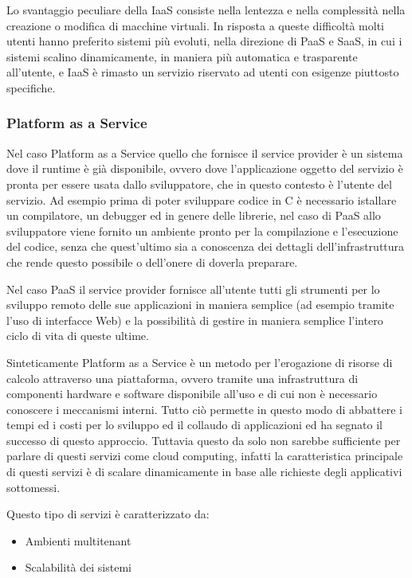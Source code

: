 \documentclass[italian,]{article}
\providecommand{\tightlist}{%
  \setlength{\itemsep}{0pt}\setlength{\parskip}{0pt}}
\begin{document}
Lo svantaggio peculiare della IaaS consiste nella lentezza e nella
complessità nella creazione o modifica di macchine virtuali. In risposta
a queste difficoltà molti utenti hanno preferito sistemi più evoluti,
nella direzione di PaaS e SaaS, in cui i sistemi scalino dinamicamente,
in maniera più automatica e trasparente all'utente, e IaaS è rimasto un
servizio riservato ad utenti con esigenze piuttosto specifiche.

\subsubsection{Platform as a Service}\label{platform-as-a-service}

Nel caso Platform as a Service quello che fornisce il service provider è
un sistema dove il runtime è già disponibile, ovvero dove l'applicazione
oggetto del servizio è pronta per essere usata dallo sviluppatore, che
in questo contesto è l'utente del servizio. Ad esempio prima di poter
sviluppare codice in C è necessario istallare un compilatore, un
debugger ed in genere delle librerie, nel caso di PaaS allo sviluppatore
viene fornito un ambiente pronto per la compilazione e l'esecuzione del
codice, senza che quest'ultimo sia a conoscenza dei dettagli
dell'infrastruttura che rende questo possibile o dell'onere di doverla
preparare.

Nel caso PaaS il service provider fornisce all'utente tutti gli
strumenti per lo sviluppo remoto delle sue applicazioni in maniera
semplice (ad esempio tramite l'uso di interfacce Web) e la possibilità
di gestire in maniera semplice l'intero ciclo di vita di queste ultime.

Sinteticamente Platform as a Service è un metodo per l'erogazione di
risorse di calcolo attraverso una piattaforma, ovvero tramite una
infrastruttura di componenti hardware e software disponibile all'uso e
di cui non è necessario conoscere i meccanismi interni. Tutto ciò
permette in questo modo di abbattere i tempi ed i costi per lo sviluppo
ed il collaudo di applicazioni ed ha segnato il successo di questo
approccio. Tuttavia questo da solo non sarebbe sufficiente per parlare
di questi servizi come cloud computing, infatti la caratteristica
principale di questi servizi è di scalare dinamicamente in base alle
richieste degli applicativi sottomessi.

Questo tipo di servizi è caratterizzato da:

\begin{itemize}
\tightlist
\item
  Ambienti multitenant
\item
  Scalabilità dei sistemi
\end{itemize}
\end{document}
